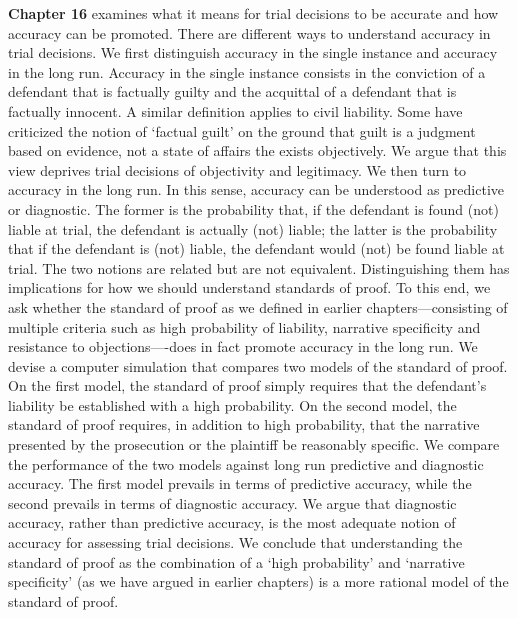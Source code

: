 \documentclass[
  10pt,
  dvipsnames,enabledeprecatedfontcommands]{scrartcl}
\newcommand{\raf}[1]{\todo[color=olive!40]{#1}}
\begin{document}
\textbf{Chapter 16} examines what it means for trial decisions to be
accurate and how accuracy can be promoted. There are different ways to
understand accuracy in trial decisions. We first distinguish accuracy in
the single instance and accuracy in the long run. Accuracy in the single
instance consists in the conviction of a defendant that is factually
guilty and the acquittal of a defendant that is factually innocent. A
similar definition applies to civil liability. Some have criticized the
notion of `factual guilt' on the ground that guilt is a judgment based
on evidence, not a state of affairs the exists objectively. We argue
that this view deprives trial decisions of objectivity and legitimacy.
We then turn to accuracy in the long run. In this sense, accuracy can be
understood as predictive or diagnostic. The former is the probability
that, if the defendant is found (not) liable at trial, the defendant is
actually (not) liable; the latter is the probability that if the
defendant is (not) liable, the defendant would (not) be found liable at
trial. The two notions are related but are not equivalent.
Distinguishing them has implications for how we should understand
standards of proof. To this end, we ask whether the standard of proof as
we defined in earlier chapters---consisting of multiple criteria such as
high probability of liability, narrative specificity and resistance to
objections----does in fact promote accuracy in the long run. We devise a
computer simulation that compares two models of the standard of proof.
On the first model, the standard of proof simply requires that the
defendant's liability be established with a high probability. On the
second model, the standard of proof requires, in addition to high
probability, that the narrative presented by the prosecution or the
plaintiff be reasonably specific. We compare the performance of the two
models against long run predictive and diagnostic accuracy. The first
model prevails in terms of predictive accuracy, while the second
prevails in terms of diagnostic accuracy. We argue that diagnostic
accuracy, rather than predictive accuracy, is the most adequate notion
of accuracy for assessing trial decisions. We conclude that
understanding the standard of proof as the combination of a `high
probability' and `narrative specificity' (as we have argued in earlier
chapters) is a more rational model of the standard of proof.

\raf{M: Anythign to add or remove?}
\end{document}
